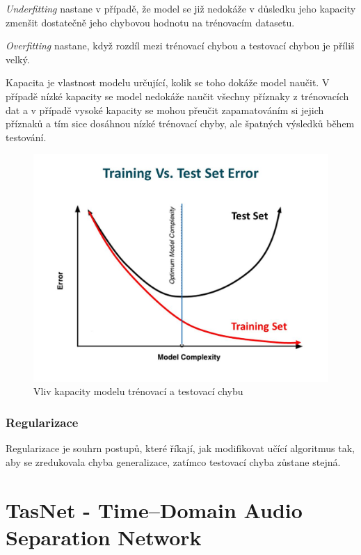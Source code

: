 \textit{Underfitting} nastane v případě, že model se již nedokáže v důsledku jeho kapacity zmenšit dostatečně jeho chybovou hodnotu na trénovacím datasetu.

\textit{Overfitting} nastane, když rozdíl mezi trénovací chybou a testovací chybou je příliš velký.

Kapacita je vlastnost modelu určující, kolik se toho dokáže model naučit. V případě nízké kapacity se model nedokáže naučit všechny příznaky z trénovacích dat a v případě vysoké kapacity se mohou přeučit zapamatováním si jejich příznaků a tím sice dosáhnou nízké trénovací chyby, ale špatných výsledků během testování\cite[p107]{mitdeeplearning}.
\begin{figure}[H]
    \centering
    \includegraphics[scale=0.3]{obrazky-figures/capacity_vs_error.jpg}
    \caption{\label{fig:gradientdescent}Vliv kapacity modelu trénovací a testovací chybu}
\end{figure}


\subsection{Regularizace}
Regularizace je souhrn postupů, které říkají, jak modifikovat učící algoritmus tak, aby se zredukovala chyba generalizace, zatímco testovací chyba zůstane stejná\cite[p117]{mitdeeplearning}.

\chapter{TasNet - Time--Domain Audio Separation Network}
\label{tasnet}

